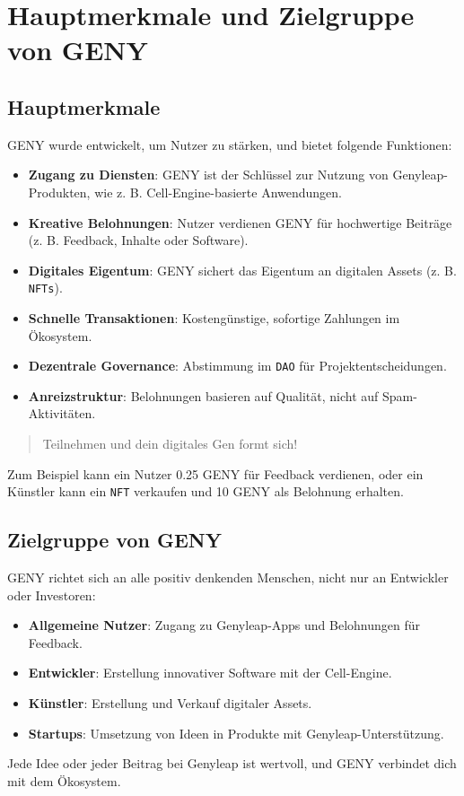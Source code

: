 \documentclass[a4paper,12pt,openany]{book}
\begin{document}
\section*{Hauptmerkmale und Zielgruppe von GENY}
\subsection*{Hauptmerkmale}
GENY wurde entwickelt, um Nutzer zu stärken, und bietet folgende Funktionen:
\begin{itemize}
    \item \textbf{Zugang zu Diensten}: GENY ist der Schlüssel zur Nutzung von Genyleap-Produkten, wie z. B. Cell-Engine-basierte Anwendungen.
    \item \textbf{Kreative Belohnungen}: Nutzer verdienen GENY für hochwertige Beiträge (z. B. Feedback, Inhalte oder Software).
    \item \textbf{Digitales Eigentum}: GENY sichert das Eigentum an digitalen Assets (z. B. \texttt{NFTs}).
    \item \textbf{Schnelle Transaktionen}: Kostengünstige, sofortige Zahlungen im Ökosystem.
    \item \textbf{Dezentrale Governance}: Abstimmung im \texttt{DAO} für Projektentscheidungen.
    \item \textbf{Anreizstruktur}: Belohnungen basieren auf Qualität, nicht auf Spam-Aktivitäten.
\end{itemize}
\begin{quote}
Teilnehmen und dein digitales Gen formt sich!
\end{quote}
Zum Beispiel kann ein Nutzer 0.25 GENY für Feedback verdienen, oder ein Künstler kann ein \texttt{NFT} verkaufen und 10 GENY als Belohnung erhalten.

\subsection*{Zielgruppe von GENY}
GENY richtet sich an alle positiv denkenden Menschen, nicht nur an Entwickler oder Investoren:
\begin{itemize}
    \item \textbf{Allgemeine Nutzer}: Zugang zu Genyleap-Apps und Belohnungen für Feedback.
    \item \textbf{Entwickler}: Erstellung innovativer Software mit der Cell-Engine.
    \item \textbf{Künstler}: Erstellung und Verkauf digitaler Assets.
    \item \textbf{Startups}: Umsetzung von Ideen in Produkte mit Genyleap-Unterstützung.
\end{itemize}
Jede Idee oder jeder Beitrag bei Genyleap ist wertvoll, und GENY verbindet dich mit dem Ökosystem.
\newpage
\end{document}
